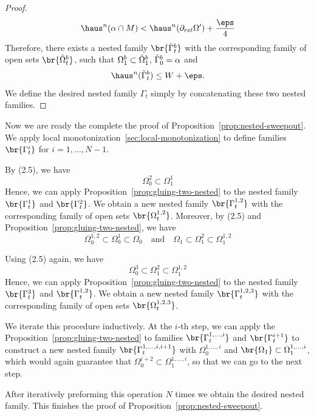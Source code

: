\begin{proposition}
\begin{proof}
        \begin{equation*}
            \haus^n(\alpha\cap M) < \haus^n(\partial_{rel}\Omega') + \frac{\eps}{4}
        \end{equation*}
        Therefore, there exists a nested family $\br{\Tilde{\Gamma}_t^b}$ with the corresponding family of open sets $\br{\Tilde{\Omega}_t^b}$, such that $\Omega_1^b \subset \Tilde{\Omega}_1^b$, $\Tilde{\Gamma}_0^b = \alpha$ and 
        \begin{equation*}
            \haus^n(\Tilde{\Gamma}_t^b) \leq W + \eps.
        \end{equation*}
        We define the desired nested family $\Gamma_t$ simply by concatenating these two nested families.
    \end{proof}
\end{proposition}
Now we are ready the complete the proof of Proposition~\ref{prop:nested-sweepout}. We apply local monotonization~\ref{sec:local-monotonization} to define families $\br{\Gamma_t^i}$ for $i = 1, \dots, N - 1$. 

By (2.5), we have
\begin{equation*}
    \Omega_0^2 \subset \Omega_1^1
\end{equation*}
Hence, we can apply Proposition~\ref{prop:gluing-two-nested} to the nested family $\br{\Gamma_t^1}$ and $\br{\Gamma_t^2}$. We obtain a new nested family $\br{\Gamma_t^{1, 2}}$ with the corresponding family of open sets $\br{\Omega_t^{1, 2}}$. Moreover, by (2.5) and Proposition~\ref{prop:gluing-two-nested}, we have 
\begin{equation*}
    \Omega_0^{1, 2} \subset \Omega_0^1 \subset \Omega_0 \quad\text{and}\quad\Omega_1 \subset \Omega_1^2 \subset \Omega_1^{1, 2}
\end{equation*}

Using (2.5) again, we have
\begin{equation*}
    \Omega_0^3 \subset \Omega_1^2 \subset \Omega_1^{1, 2}
\end{equation*}
Hence, we can apply Proposition~\ref{prop:gluing-two-nested} to the nested family $\br{\Gamma_t^3}$ and $\br{\Gamma_t^{1, 2}}$. We obtain a new nested family $\br{\Gamma_t^{1, 2, 3}}$ with the corresponding family of open sets $\br{\Omega_t^{1, 2, 3}}$.

We iterate this procedure inductively. At the $i$-th step, we can apply the Proposition~\ref{prop:gluing-two-nested} to families $\br{\Gamma_t^{1, \dots, i}}$ and $\br{\Gamma_t^{i+1}}$ to construct a new nested family $\br{\Gamma_t^{1, \dots, i, i + 1}}$ with $\Omega_0^{1, \dots, i}$ and $\br{\Omega_1} \subset \Omega_1^{1, \dots, i}$, which would again guarantee that $\Omega_0^{i + 2} \subset \Omega_1^{1, \dots, i}$, so that we can go to the next step.

After iteratively preforming this operation $N$ times we obtain the desired nested family. This finishes the proof of Proposition~\ref{prop:nested-sweepout}.
